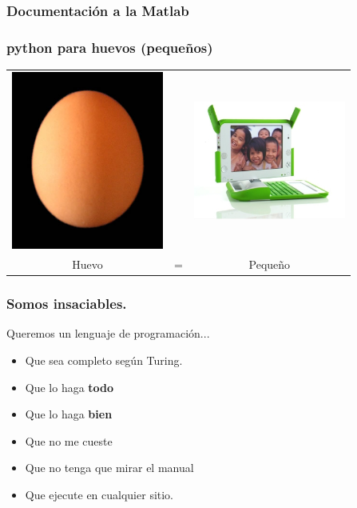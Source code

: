 \documentclass{beamer}
\begin{document}
\begin{frame}
\frametitle{Documentaci\'on a la Matlab}
\begin{scriptsize}
\testcode  
\end{scriptsize}
\end{frame}



\begin{frame}
 \frametitle{python para huevos (pequeños)}
  \begin{center}
 \begin{tabular}[h]{ccc}
   \includegraphics[width=5cm]{files/huevo.jpg} & &
   \includegraphics[width=5cm]{files/nigerian-machine.jpg}\\
   Huevo & = &Pequeño
 \end{tabular}
\end{center}
\end{frame}

\begin{frame}
  \frametitle{Somos insaciables.}
Queremos un lenguaje de programación...
  \begin{itemize}
  \item Que sea completo según Turing.
  \item Que lo haga \textbf{todo}
  \item Que lo haga \textbf{bien}
  \item Que no me cueste
  \item Que no tenga que mirar el manual
  \item Que ejecute en cualquier sitio.
  \end{itemize}
\end{frame}
\end{document}

